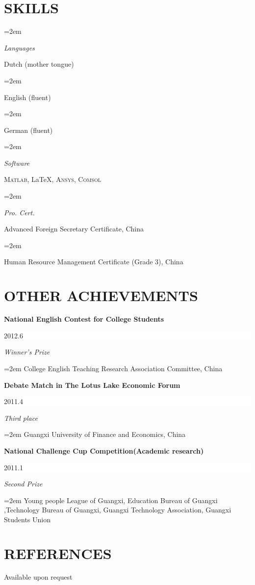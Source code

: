 \documentclass[paper=a4,fontsize=11.5pt]{scrartcl}
\newlength{\spacebox}
\newcommand{\sepspace}{\vspace*{1em}}
\newcommand{\NewPart}[1]{\section*{\uppercase{#1}}}
\newcommand{\SkillsEntry}[2]{
	\noindent\hangindent=2em\hangafter=0
	\parbox{\spacebox}{\textit{#1}}\hspace{1.5em} #2 \par}
\newcommand{\EducationEntry}[4]{
	\noindent \textbf{#1} 
	\hfill\colorbox{White}{
		\parbox{6em}{\hfill\color{Black}#2}}
	\par\noindent\textit{#3}
	\par\noindent\hangindent=2em\hangafter=0 
	\small #4\normalsize \par}
\begin{document}
\NewPart{Skills}{}

\SkillsEntry{Languages}{Dutch (mother tongue)}
\SkillsEntry{}{English (fluent)}
\SkillsEntry{}{German (fluent)} \sepspace

\SkillsEntry{Software}{\textsc{Matlab}, \LaTeX, \textsc{Ansys}, \textsc{Comsol}}\sepspace

\SkillsEntry{Pro. Cert.}{Advanced Foreign Secretary Certificate, China}

\SkillsEntry{}{Human Resource Management Certificate (Grade 3), China}

\NewPart{Other Achievements}{}

\EducationEntry{National English Contest for College Students}{2012.6}{Winner's Prize}{College English Teaching Research Association Committee, China}
\sepspace
\EducationEntry{Debate Match in The Lotus Lake Economic Forum}{2011.4}{Third place}{Guangxi University of Finance and Economics, China}
\sepspace
\EducationEntry{National Challenge Cup Competition(Academic research)}{2011.1}{Second Prize}{Young people League of Guangxi, Education Bureau of Guangxi ,Technology Bureau of Guangxi, Guangxi Technology Association, Guangxi Students Union}
\sepspace
\NewPart{References}
Available upon request
\end{document}
